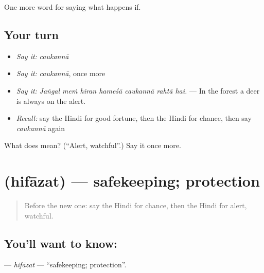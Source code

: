 \begin{grammarlens}[title={What you've built}]
One more word for saying what happens if.
\end{grammarlens}

\subsection*{Your turn}
\begin{itemize}
\raggedright
  \item \emph{Say it:} \emph{caukannā}
  \item \emph{Say it:} \emph{caukannā}, once more
  \item \emph{Say it:} \emph{Jaṅgal meṁ hiran hameśā caukannā rahtā hai.} — In the forest a deer is always on the alert.
  \item \emph{Recall:} say the Hindi for good fortune, then the Hindi for chance, then say \emph{caukannā} again
\end{itemize}

\begin{tcolorbox}[breakable,colback=teal!4,colframe=teal!35!black,title={Before you move on}]
What does  mean? (\textquotedblleft{}Alert, watchful\textquotedblright{}.) Say it once more.
\end{tcolorbox}
\section[\texorpdfstring{\hi{हिफ़ाज़त} (hifāzat)}{हिफ़ाज़त (hifāzat)}]{ (hifāzat) — safekeeping; protection}

\label{lesson:HI-C547-hifazat}



\begin{quote}
Before the new one: say the Hindi for chance, then the Hindi for alert, watchful.
\end{quote}

\subsection*{You'll want to know: }
\textbf{} — \emph{hifāzat} — \textquotedblleft{}safekeeping; protection\textquotedblright{}.

\begin{quote}
        
\end{quote}

